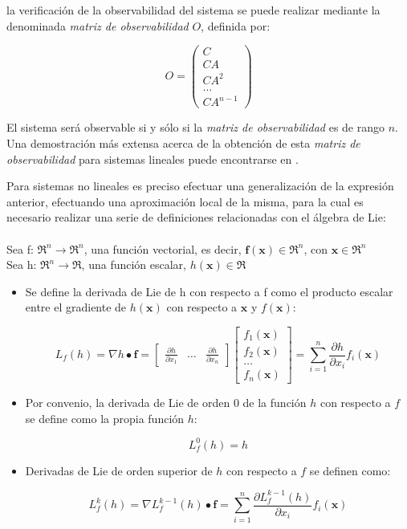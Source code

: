 \noindent
la verificación de la observabilidad del sistema se puede realizar mediante la denominada \emph{matriz de observabilidad} $O$, definida por:

\[
	O = \begin{pmatrix}
		C \\ CA \\ CA^{2} \\ \ldots \\ CA^{n-1}
	\end{pmatrix}
\]

El sistema será observable si y sólo si la \emph{matriz de observabilidad} es de rango $n$. Una demostración más extensa acerca de la obtención de esta \emph{matriz de observabilidad} para sistemas lineales puede encontrarse en \cite{dominguez2000control}. \par 

Para sistemas no lineales es preciso efectuar una generalización de la expresión anterior, efectuando una aproximación local de la misma, para la cual es necesario realizar una serie de definiciones relacionadas con el álgebra de Lie: \\ \\
\noindent
Sea f: $\Re^{n} \to \Re^{n}$, una función vectorial, es decir, $\boldsymbol{f}(\boldsymbol{x}) \in \Re^{n}$, con  $\boldsymbol{x} \in \Re^{n}$ \\
Sea h: $\Re^{n} \to \Re$, una función escalar, $h(\boldsymbol{x}) \in \Re$

\begin{itemize}
\item Se define la derivada de Lie de h con respecto a f como el producto escalar entre el gradiente de $h(\boldsymbol{x})$ con respecto a $\boldsymbol{x}$ y $f(\boldsymbol{x})$:
  
\[
	L_f(h) = \nabla h \bullet \boldsymbol{f} = 
	\begin{bmatrix}
		\frac{\partial h}{\partial x_1} &  \dots & \frac{\partial h}{\partial x_n}
	\end{bmatrix}
	\begin{bmatrix}
		f_1(\boldsymbol{x}) \\ f_2(\boldsymbol{x}) \\ \dots \\ f_n(\boldsymbol{x})
	\end{bmatrix} = 
	\sum_{i=1}^{n} \frac{\partial h}{\partial x_i} f_i(\boldsymbol{x})
\]  
  
\item Por convenio, la derivada de Lie de orden 0 de la función $h$ con respecto a $f$ se define como la propia función $h$:

\[ 	L_f^{0}(h) = h \]  

\item Derivadas de Lie de orden superior de $h$ con respecto a $f$ se definen como:

\[
	L_f^{k}(h) = \nabla L_f^{k-1}(h) \bullet \boldsymbol{f} = 
	\sum_{i=1}^{n} \frac{\partial L_f^{k-1}(h)}{\partial x_i} f_i(\boldsymbol{x})
\]

\end{itemize}

